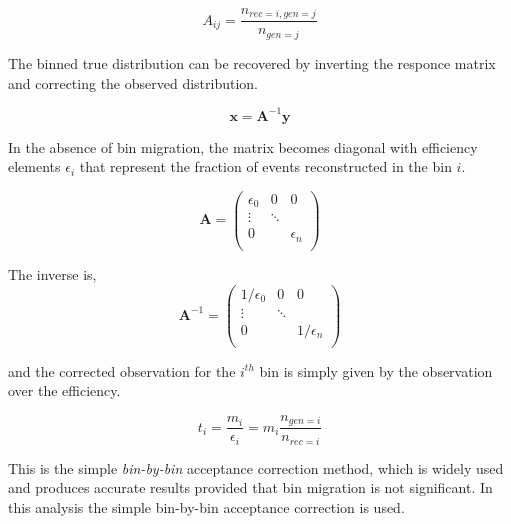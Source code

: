 \begin{equation}
  A_{ij} = \frac{n_{rec=i, gen=j}}{n_{gen=j}}
\end{equation}

The binned true distribution can be recovered by inverting the responce matrix and correcting the observed distribution.

\begin{equation}
  \mathbf{x} = \mathbf{A}^{-1} \mathbf{y} 
\end{equation}

In the absence of bin migration, the matrix becomes diagonal with efficiency elements $\epsilon_i$ that represent the fraction of events reconstructed in the bin $i$.

\begin{equation}
  \mathbf{A} = \begin{pmatrix}
    \epsilon_0 & 0 & 0\\
    \vdots & \ddots \\
    0 &  & \epsilon_n \\
  \end{pmatrix}
\end{equation}


The inverse is, 
\begin{equation}
  \mathbf{A}^{-1} = \begin{pmatrix}
    1/\epsilon_0 & 0 & 0\\
    \vdots & \ddots \\
    0 &  & 1/\epsilon_n \\
  \end{pmatrix}
\end{equation}

and the corrected observation for the $i^{th}$ bin is simply given by the observation over the efficiency.

\begin{equation}
  t_i = \frac{m_i}{\epsilon_i} = m_i \frac{n_{gen=i}}{n_{rec=i}}
\end{equation}

This is the simple \textit{bin-by-bin} acceptance correction method, which is widely used and produces accurate results provided that bin migration is not significant.  In this analysis the simple bin-by-bin acceptance correction is used.  


